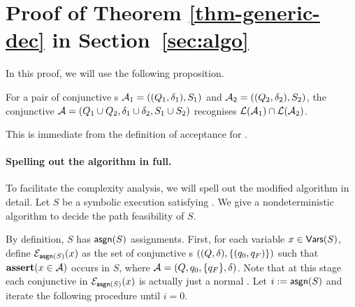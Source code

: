 
\section{Proof of Theorem \ref{thm-generic-dec} in Section~\ref{sec:algo}}\label{app:algo}

In this proof, we will use the following proposition.
\begin{proposition}\label{prop-conj-fa-prod}
For a pair of conjunctive \FA{}s $\mathcal{A}_1 = ((Q_1, \delta_1), S_1)$
    and $\mathcal{A}_2 = ((Q_2, \delta_2), S_2)$, the conjunctive \FA{} 
    $\mathcal{A} = (Q_1 \cup Q_2, \delta_1 \cup \delta_2, S_1
    \cup S_2)$ recognises $\mathcal{L}(\mathcal{A}_1) \cap \mathcal{L}(\mathcal{A}_2)$.
\end{proposition}
This is immediate from the definition of acceptance for \FA{}.

\paragraph{Spelling out the algorithm in full.}
To facilitate the complexity analysis, we will spell out the modified algorithm 
in detail. Let $S$ be a symbolic execution satisfying \prerec{} . 
We give a nondeterministic algorithm to decide the path feasibility of
$S$. 

By definition, $S$ has $\mathsf{asgn}(S)$ assignments.
First, for each variable $x \in \mathsf{Vars}(S)$,
define $\mathcal{E}_{\mathsf{asgn}(S)}(x)$  as the set of conjunctive \FA{}s $((Q, \delta), \{(q_0, q_F)\})$ such that $\textbf{assert}(x \in \mathcal{A})$ occurs in $S$, where $\mathcal{A}= (Q, q_0, \{q_F\}, \delta)$. 
Note that at this stage each conjunctive \FA{} in $\mathcal{E}_{\mathsf{asgn}(S)}(x)$ is 
actually just a normal \FA{}. Let $i:=\mathsf{asgn}(S)$ and iterate the following procedure until $i=0$.

